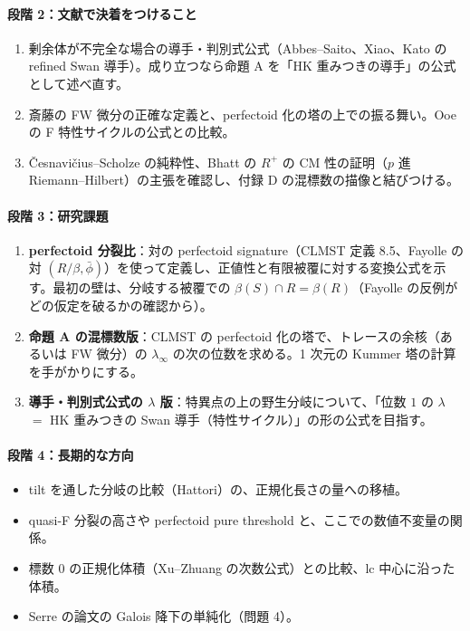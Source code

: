 \documentclass[11pt,a4paper]{ltjsarticle}
\theoremstyle{plain}
\theoremstyle{definition}
\theoremstyle{remark}
\theoremstyle{plain}
\begin{document}
\paragraph{段階 2：文献で決着をつけること}
\begin{enumerate}
  \item 剰余体が不完全な場合の導手・判別式公式（Abbes--Saito、Xiao、Kato の refined Swan 導手）。成り立つなら命題 A を「HK 重みつきの導手」の公式として述べ直す。
  \item 斎藤の FW 微分の正確な定義と、perfectoid 化の塔の上での振る舞い。Ooe の F 特性サイクルの公式との比較。
  \item Česnavičius--Scholze の純粋性、Bhatt の $R^+$ の CM 性の証明（$p$ 進 Riemann--Hilbert）の主張を確認し、付録 D の混標数の描像と結びつける。
\end{enumerate}
\paragraph{段階 3：研究課題}
\begin{enumerate}
  \item \textbf{perfectoid 分裂比}：対の perfectoid signature（CLMST 定義 8.5、Fayolle の対 $(R/\beta,\bar\phi)$）を使って定義し、正値性と有限被覆に対する変換公式を示す。最初の壁は、分岐する被覆での $\beta(S)\cap R = \beta(R)$（Fayolle の反例がどの仮定を破るかの確認から）。
  \item \textbf{命題 A の混標数版}：CLMST の perfectoid 化の塔で、トレースの余核（あるいは FW 微分）の $\lambda_\infty$ の次の位数を求める。1 次元の Kummer 塔の計算を手がかりにする。
  \item \textbf{導手・判別式公式の $\lambda$ 版}：特異点の上の野生分岐について、「位数 $1$ の $\lambda$ $=$ HK 重みつきの Swan 導手（特性サイクル）」の形の公式を目指す。
\end{enumerate}
\paragraph{段階 4：長期的な方向}
\begin{itemize}
  \item tilt を通した分岐の比較（Hattori）の、正規化長さの量への移植。
  \item quasi-F 分裂の高さや perfectoid pure threshold と、ここでの数値不変量の関係。
  \item 標数 $0$ の正規化体積（Xu--Zhuang の次数公式）との比較、lc 中心に沿った体積。
  \item Serre の論文の Galois 降下の単純化（問題 4）。
\end{itemize}
\end{document}
